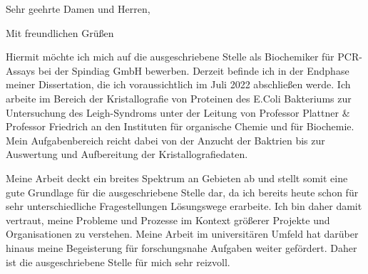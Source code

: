 


\date{\today}
\opening{Sehr geehrte Damen und Herren,}
\closing{Mit freundlichen Grüßen}
{}
\makelettertitle
\justifying

Hiermit möchte ich mich auf die ausgeschriebene Stelle als Biochemiker für PCR-Assays bei der Spindiag GmbH bewerben. Derzeit befinde ich in der Endphase meiner Dissertation, die ich voraussichtlich im Juli 2022 abschließen werde. Ich arbeite im Bereich der Kristallografie von Proteinen des E.Coli Bakteriums zur Untersuchung des Leigh-Syndroms unter der Leitung von Professor Plattner \& Professor Friedrich an den Instituten für organische Chemie und für Biochemie. Mein Aufgabenbereich reicht dabei von der Anzucht der Baktrien bis zur Auswertung und Aufbereitung der Kristallografiedaten.\par
Meine Arbeit deckt ein breites Spektrum an Gebieten ab und stellt somit eine gute Grundlage für die ausgeschriebene Stelle dar, da ich bereits heute schon für sehr unterschiedliche Fragestellungen Lösungswege erarbeite. Ich bin daher damit vertraut, meine Probleme und Prozesse im Kontext größerer Projekte und Organisationen zu verstehen. Meine Arbeit im universitären Umfeld hat darüber hinaus meine Begeisterung für forschungsnahe Aufgaben weiter gefördert. Daher ist die ausgeschriebene Stelle für mich sehr reizvoll.\par 


